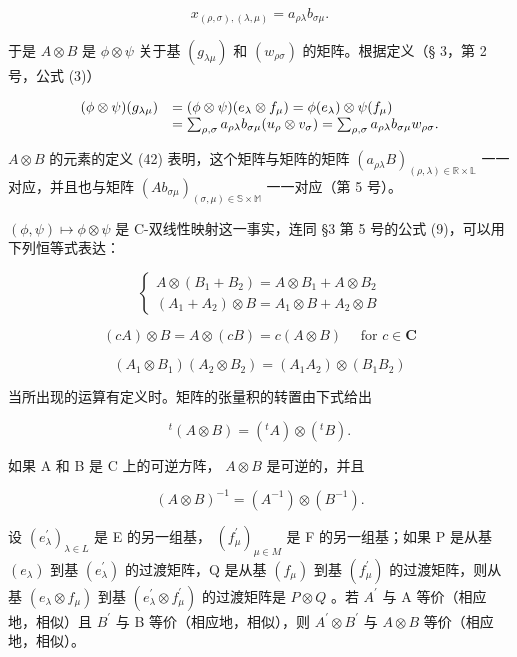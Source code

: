 \[
x _ {(\rho , \sigma), (\lambda , \mu)} = a _ {\rho \lambda} b _ {\sigma \mu}.\tag{42}
\]

于是 \(A \otimes B\) 是 \(\phi \otimes \psi\) 关于基 \((g_{\lambda \mu})\) 和 \((w_{\rho \sigma})\) 的矩阵。根据定义（§ 3，第 2 号，公式 (3)）

\[
\begin{array}{r l} (\phi \otimes \psi) (g _ {\lambda \mu}) & = (\phi \otimes \psi) (e _ {\lambda} \otimes f _ {\mu}) = \phi (e _ {\lambda}) \otimes \psi (f _ {\mu}) \\ & = \sum_ {\rho , \sigma} a _ {\rho \lambda} b _ {\sigma \mu} (u _ {\rho} \otimes v _ {\sigma}) = \sum_ {\rho , \sigma} a _ {\rho \lambda} b _ {\sigma \mu} w _ {\rho \sigma}. \end{array}
\]

 \(A \otimes B\) 的元素的定义 (42) 表明，这个矩阵与矩阵的矩阵 \((a_{\rho \lambda}B)_{(\rho, \lambda) \in \mathbb{R} \times \mathbb{L}}\) 一一对应，并且也与矩阵 \((Ab_{\sigma \mu})_{(\sigma, \mu) \in \mathbb{S} \times \mathbb{M}}\) 一一对应（第 5 号）。

 \((\phi, \psi) \mapsto \phi \otimes \psi\) 是 C-双线性映射这一事实，连同 §3 第 5 号的公式 (9)，可以用下列恒等式表达：

\[
\left\{ \begin{array}{l} A \otimes (B _ {1} + B _ {2}) = A \otimes B _ {1} + A \otimes B _ {2} \\ (A _ {1} + A _ {2}) \otimes B = A _ {1} \otimes B + A _ {2} \otimes B \end{array} \right.\tag{43}
\]

\[
(c A) \otimes B = A \otimes (c B) = c (A \otimes B) \quad \text { for } c \in \mathbf {C}\tag{44}
\]

\[
(A _ {1} \otimes B _ {1}) (A _ {2} \otimes B _ {2}) = (A _ {1} A _ {2}) \otimes (B _ {1} B _ {2})\tag{45}
\]

当所出现的运算有定义时。矩阵的张量积的转置由下式给出

\[
{ } ^ { t } ( A \otimes B ) = ( { } ^ { t } A ) \otimes ( { } ^ { t } B ) .\tag{46}
\]

如果 A 和 B 是 C 上的可逆方阵， \(A \otimes B\) 是可逆的，并且

\[
(A \otimes B) ^ {- 1} = (A ^ {- 1}) \otimes (B ^ {- 1}).\tag{47}
\]

设 \((e_{\lambda}^{\prime})_{\lambda \in L}\) 是 E 的另一组基， \((f_{\mu}^{\prime})_{\mu \in M}\) 是 F 的另一组基；如果 P 是从基 \((e_{\lambda})\) 到基 \((e_{\lambda}^{\prime})\) 的过渡矩阵，Q 是从基 \((f_{\mu})\) 到基 \((f_{\mu}^{\prime})\) 的过渡矩阵，则从基 \((e_{\lambda} \otimes f_{\mu})\) 到基 \((e_{\lambda}^{\prime} \otimes f_{\mu}^{\prime})\) 的过渡矩阵是 \(P \otimes Q\) 。若 \(A^{\prime}\) 与 A 等价（相应地，相似）且 \(B^{\prime}\) 与 B 等价（相应地，相似），则 \(A^{\prime} \otimes B^{\prime}\) 与 \(A \otimes B\) 等价（相应地，相似）。

